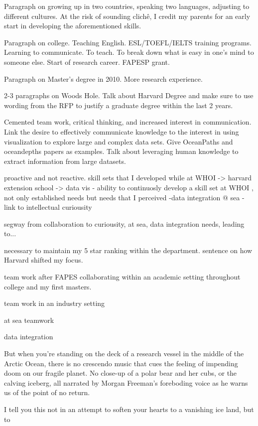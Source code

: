 Paragraph on growing up in two countries, speaking two languages, adjusting to different cultures.  At the risk of sounding clichê, I credit my parents for an early start in developing the aforementioned skills. 

Paragraph on college. Teaching English. ESL/TOEFL/IELTS training programs. 
Learning to communicate. To teach. To break down what is easy in one’s mind to someone else. Start of research career. FAPESP grant. 

Paragraph on Master’s degree in 2010. 
More research experience. 

2-3 paragraphs on Woods Hole. Talk about Harvard Degree and make sure to use wording from the RFP to justify a graduate degree within the last 2 years. 

Cemented team work, critical thinking, and increased interest in communication. Link the desire to effectively communicate knowledge to the interest in using visualization to explore large and complex data sets. Give OceanPaths and oceandepths papers as examples. Talk about leveraging human knowledge to extract information from large datasets. 


proactive and not reactive. skill sets that I developed while at WHOI -> harvard extension school -> data vis
- ability to continuosly develop a skill set at WHOI , not only established needs but needs that I perceived
-data integration @ sea - link to intellectual curiousity 

segway from collaboration to curiousity, at sea, data integration needs, leading to...

necessary to maintain my 5 star ranking within the department. 
sentence on how Harvard shifted my focus. 

team work
after FAPES 
collaborating within an academic setting throughout college and my first masters. 

team work in an industry setting

at sea teamwork

data integration 

But when you're standing on the deck of a research vessel in the middle of the Arctic Ocean, there is no crescendo music that cues the feeling of impending doom on our fragile planet. No close-up of a polar bear and her cubs, or the calving iceberg, all narrated by Morgan Freeman's foreboding voice as he warns us of the point of no return.

I tell you this not in an attempt to soften your hearts to a vanishing ice land, but to 

